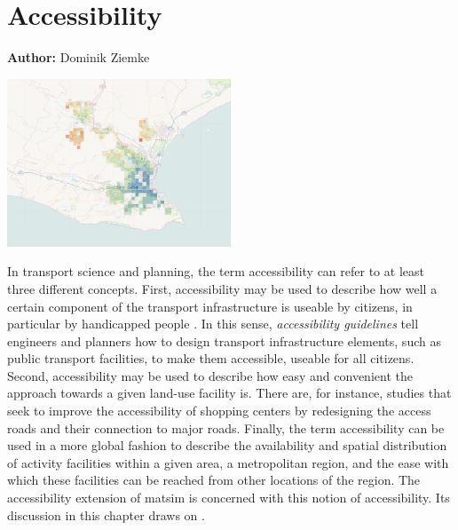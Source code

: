 \chapter{Accessibility}
\label{ch:accessibility}

\hfill \textbf{Author:} Dominik Ziemke

\begin{center} \includegraphics[width=0.5\textwidth, angle=0]{extending/figures/accessibility/w_freeSpeed_snapshot.png} \end{center}



In transport science and planning, the term accessibility can refer to at least three different concepts. 
First, accessibility may be used to describe how well a certain component of the transport infrastructure 
is useable by citizens, in particular by handicapped people \citep{Faura2012AccessibilityEvaluationTrafficSimulation}. 
In this sense, \textit{accessibility guidelines} tell engineers and planners how to design transport 
infrastructure elements, such as public transport facilities, to make them accessible, \ie useable 
for all citizens. Second, accessibility may be used to describe how easy and convenient the approach 
towards a given land-use facility is. There are, for instance, studies \citep{Fujiyama2004AccessibleDesignPTFacilities} 
that seek to improve the accessibility of shopping centers by redesigning the access roads and their 
connection to major roads. Finally, the term accessibility can be used in a more global fashion to 
describe the availability and spatial distribution of activity facilities within a given area, \eg a 
metropolitan region, and the ease with which these facilities can be reached from other locations of 
the region. The accessibility extension of \gls{matsim} is concerned with this notion of accessibility. 
Its discussion in this chapter draws on \citet{NicolaiNagel2012HiResAccessibilityMethodInBook}.


